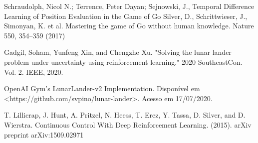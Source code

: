 \documentclass[letterpaper, 10 pt, conference]{ieeeconf}  %
\begin{document}












\begin{thebibliography}{99}

 Schraudolph, Nicol N.; Terrence, Peter Dayan; Sejnowski, J., Temporal Difference Learning of Position Evaluation in the Game of Go
 Silver, D., Schrittwieser, J., Simonyan, K. et al. Mastering the game of Go without human knowledge. Nature 550, 354–359 (2017)

 Gadgil, Soham, Yunfeng Xin, and Chengzhe Xu. "Solving the lunar lander problem under uncertainty using reinforcement learning." 2020 SoutheastCon. Vol. 2. IEEE, 2020.

 OpenAI Gym's LunarLander-v2 Implementation. Disponível em
<https://github.com/svpino/lunar-lander>. Acesso em 17/07/2020.

T. Lillicrap, J. Hunt, A. Pritzel, N. Heess, T. Erez, Y. Tassa, D. Silver, and D. Wierstra. Continuous Control With Deep Reinforcement Learning. (2015). arXiv preprint arXiv:1509.02971


\end{thebibliography}
\end{document}
